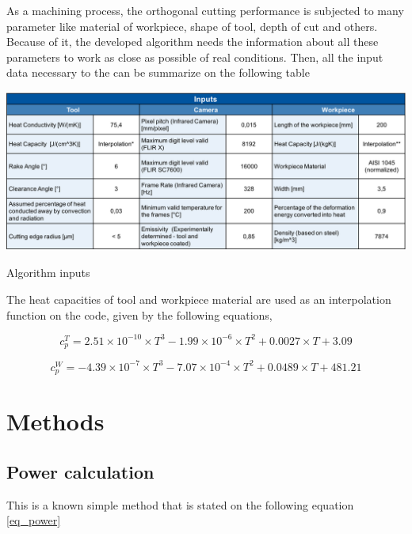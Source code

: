 	As a machining process, the orthogonal cutting performance is subjected to many parameter like material of workpiece, shape of tool, depth of cut and others. Because of it, the developed algorithm needs the information about all these parameters to work as close as possible of real conditions. Then, all the input data necessary to the  can be summarize on the following table

	\begin{table}[H]
		\centering
		\captionsetup{justification=centering}
		\includegraphics[scale = 0.6]{Imagens/Inputs.png}
		\caption{Algorithm inputs \cite{augspurger2016experimental}}
		\label{tab:inputs}
	\end{table}

	The heat capacities of tool and workpiece material are used as an interpolation function on the code, given by the following equations,

	\begin{equation} 
	\label{eq_heatCapTool}
		c_{p}^{T} = 2.51\times 10^{- 10}\times T^{3} - 1.99\times 10^{- 6} \times T^{2} + 0.0027 \times T + 3.09
	\end{equation}

	\begin{equation} 
	\label{eq_heatCapWork}
		c_{p}^{W} = -4.39\times 10^{- 7}\times T^{3} - 7.07\times 10^{- 4} \times T^{2} + 0.0489 \times T + 481.21
	\end{equation}

	\section{Methods}
	\label{methods}
	
	\subsection{Power calculation}
	This is a known simple method that is stated on the following equation \ref{eq_power}

